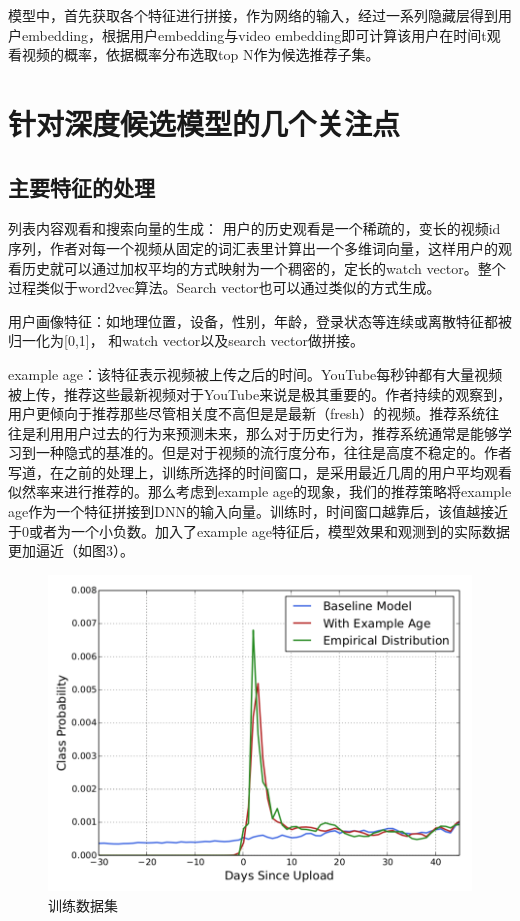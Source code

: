 \documentclass[UTF8]{ctexart}
\begin{document}
		模型中，首先获取各个特征进行拼接，作为网络的输入，经过一系列隐藏层得到用户embedding，根据用户embedding与video embedding即可计算该用户在时间t观看视频的概率，依据概率分布选取top N作为候选推荐子集。
	\clearpage
	\section{针对深度候选模型的几个关注点}\label{sec:disijie}
	\subsection{主要特征的处理}
	列表内容观看和搜索向量的生成： 用户的历史观看是一个稀疏的，变长的视频id序列，作者对每一个视频从固定的词汇表里计算出一个多维词向量，这样用户的观看历史就可以通过加权平均的方式映射为一个稠密的，定长的watch vector。整个过程类似于word2vec算法。Search vector也可以通过类似的方式生成。

	用户画像特征：如地理位置，设备，性别，年龄，登录状态等连续或离散特征都被归一化为[0,1]， 和watch vector以及search vector做拼接。
	
	example age：该特征表示视频被上传之后的时间。YouTube每秒钟都有大量视频被上传，推荐这些最新视频对于YouTube来说是极其重要的。作者持续的观察到，用户更倾向于推荐那些尽管相关度不高但是是最新（fresh）的视频。推荐系统往往是利用用户过去的行为来预测未来，那么对于历史行为，推荐系统通常是能够学习到一种隐式的基准的。但是对于视频的流行度分布，往往是高度不稳定的。作者写道，在之前的处理上，训练所选择的时间窗口，是采用最近几周的用户平均观看似然率来进行推荐的。那么考虑到example age的现象，我们的推荐策略将example age作为一个特征拼接到DNN的输入向量。训练时，时间窗口越靠后，该值越接近于0或者为一个小负数。加入了example age特征后，模型效果和观测到的实际数据更加逼近（如图3）。
	\begin{figure}[ht]
	    \centering
	    \includegraphics[scale=0.5]{picture/003.png}
	    \caption{训练数据集}
	    \label{fig:003}
	\end{figure}
\end{document}
